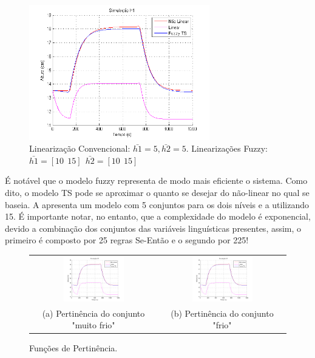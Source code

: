 \begin{figure}[H]
	\centering
	\includegraphics[width=0.7\textwidth]{img/FM_h1_5_10_15.png}
	\caption{\small Linearização Convencional: $ \bar{h1}=5, \bar{h2}=5$. Linearizações Fuzzy: $\bar{h1}=[10 \ \ 15] \ \ \bar{h2}=[10 \ \ 15]$ }
	\label{figH2TS2}
\end{figure}

É notável que o modelo fuzzy representa de modo mais eficiente o sistema. Como dito, o modelo TS pode se aproximar o quanto se desejar do não-linear no qual se baseia. A  apresenta um modelo com 5 conjuntos para os dois níveis e a  utilizando 15. É importante notar, no entanto, que a complexidade do modelo é exponencial, devido a combinação dos conjuntos das variáveis linguísticas presentes, assim, o primeiro é composto por 25 regras Se-Então e o segundo por 225!

\begin{figure}[H]
	\centering
	\begin{tabular}{cc}
		\includegraphics[width=0.5\textwidth,keepaspectratio]{img/FM_h1_5_10_15.png} &
		\includegraphics[width=0.5\textwidth,keepaspectratio]{img/FM_h1_5_10_15.png} \\
		(a) Pertinência do conjunto "muito frio" &
		(b) Pertinência do conjunto "frio"
	\end{tabular}
	\caption{\label{imgTS5} Funções de Pertinência.}
\end{figure}

